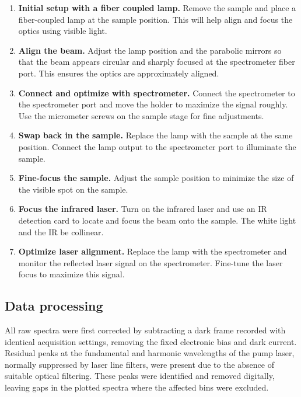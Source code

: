 \documentclass[
	parskip=half,
	a4paper,
]{scrarticle}
\begin{document}
\begin{enumerate}
  \item \textbf{Initial setup with a fiber coupled lamp.}  
  Remove the sample and place a fiber-coupled lamp at the sample position. This will help align and focus the optics using visible light.

  \item \textbf{Align the beam.}  
  Adjust the lamp position and the parabolic mirrors so that the beam appears circular and sharply focused at the spectrometer fiber port. This ensures the optics are approximately aligned.

  \item \textbf{Connect and optimize with spectrometer.}  
  Connect the spectrometer to the spectrometer port and move the holder to maximize the signal roughly. Use the micrometer screws on the sample stage for fine adjustments.

  \item \textbf{Swap back in the sample.}  
  Replace the lamp with the sample at the same position. Connect the lamp output to the spectrometer port to illuminate the sample.

  \item \textbf{Fine-focus the sample.}  
  Adjust the sample position to minimize the size of the visible spot on the sample.

  \item \textbf{Focus the infrared laser.}  
  Turn on the infrared laser and use an IR detection card to locate and focus the beam onto the sample. The white light and the IR be collinear.

  \item \textbf{Optimize laser alignment.}  
  Replace the lamp with the spectrometer and monitor the reflected laser signal on the spectrometer. Fine-tune the laser focus to maximize this signal.
\end{enumerate}

\subsection{Data processing}
All raw spectra were first corrected by subtracting a dark frame recorded with identical acquisition settings, removing the fixed electronic bias and dark current.  
Residual peaks at the fundamental and harmonic wavelengths of the pump laser, normally suppressed by laser line filters, were present due to the absence of suitable optical filtering.  
These peaks were identified and removed digitally, leaving gaps in the plotted spectra where the affected bins were excluded.  
\end{document}
